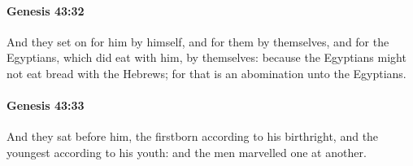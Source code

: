 		\paragraph{Genesis 43:32} %
			\label{GENESIS-43-32}

			And they set on for him by himself, and for them by themselves, and for the Egyptians, which did eat with him, by themselves: because the Egyptians might not eat bread with the Hebrews; for that is an abomination unto the Egyptians.


		\paragraph{Genesis 43:33} %
			\label{GENESIS-43-33}

			And they sat before him, the firstborn according to his birthright, and the youngest according to his youth: and the men marvelled one at another.

